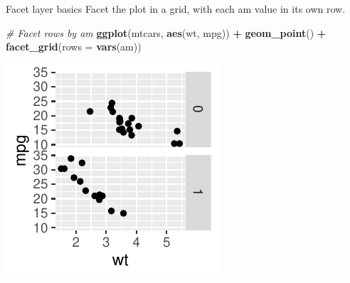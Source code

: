 \documentclass[
  ignorenonframetext,
]{beamer}
\newenvironment{Shaded}{\begin{snugshade}}{\end{snugshade}}
\newcommand{\AttributeTok}[1]{\textcolor[rgb]{0.13,0.29,0.53}{#1}}
\newcommand{\CommentTok}[1]{\textcolor[rgb]{0.56,0.35,0.01}{\textit{#1}}}
\newcommand{\FunctionTok}[1]{\textcolor[rgb]{0.13,0.29,0.53}{\textbf{#1}}}
\newcommand{\NormalTok}[1]{#1}
\newcommand{\SpecialCharTok}[1]{\textcolor[rgb]{0.81,0.36,0.00}{\textbf{#1}}}
\begin{document}
\begin{frame}[fragile]{Facet layer basics}
\label{facet-layer-basics-3}
Facet the plot in a grid, with each am value in its own row.


\begin{Shaded}
\begin{Highlighting}[]
\CommentTok{\# Facet rows by am}
\FunctionTok{ggplot}\NormalTok{(mtcars, }\FunctionTok{aes}\NormalTok{(wt, mpg)) }\SpecialCharTok{+} \FunctionTok{geom\_point}\NormalTok{() }\SpecialCharTok{+} \FunctionTok{facet\_grid}\NormalTok{(}\AttributeTok{rows =} \FunctionTok{vars}\NormalTok{(am))}
\end{Highlighting}
\end{Shaded}

\begin{center}\includegraphics[width=0.5\linewidth]{Figs/unnamed-chunk-73-1} \end{center}
\end{frame}
\end{document}
